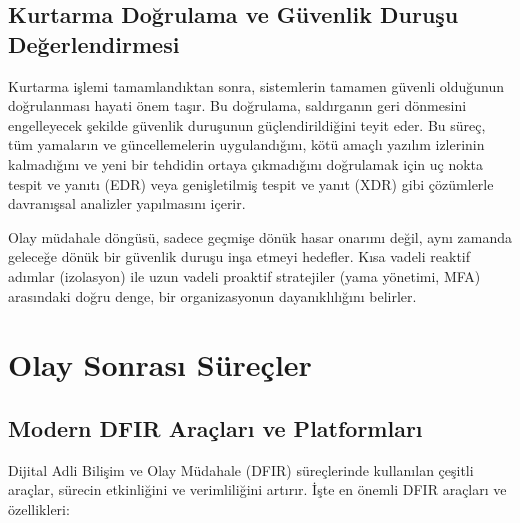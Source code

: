 \subsection{Kurtarma Doğrulama ve Güvenlik Duruşu Değerlendirmesi}

Kurtarma işlemi tamamlandıktan sonra, sistemlerin tamamen güvenli olduğunun doğrulanması hayati önem taşır. Bu doğrulama, saldırganın geri dönmesini engelleyecek şekilde güvenlik duruşunun güçlendirildiğini teyit eder. Bu süreç, tüm yamaların ve güncellemelerin uygulandığını, kötü amaçlı yazılım izlerinin kalmadığını ve yeni bir tehdidin ortaya çıkmadığını doğrulamak için uç nokta tespit ve yanıtı (EDR) veya genişletilmiş tespit ve yanıt (XDR) gibi çözümlerle davranışsal analizler yapılmasını içerir.

Olay müdahale döngüsü, sadece geçmişe dönük hasar onarımı değil, aynı zamanda geleceğe dönük bir güvenlik duruşu inşa etmeyi hedefler. Kısa vadeli reaktif adımlar (izolasyon) ile uzun vadeli proaktif stratejiler (yama yönetimi, MFA) arasındaki doğru denge, bir organizasyonun dayanıklılığını belirler.

\section{Olay Sonrası Süreçler}

\subsection{Modern DFIR Araçları ve Platformları}

Dijital Adli Bilişim ve Olay Müdahale (DFIR) süreçlerinde kullanılan çeşitli araçlar, sürecin etkinliğini ve verimliliğini artırır. İşte en önemli DFIR araçları ve özellikleri:


